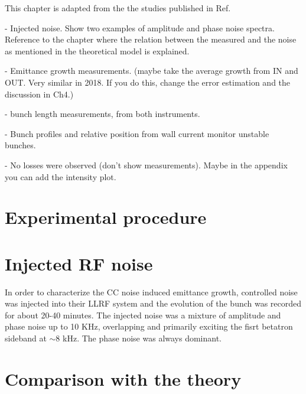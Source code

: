 \vspace*{-1mm}
 This chapter is adapted from the the studies published in Ref.~\cite{Triantafyllou}

- Injected noise. Show two examples of amplitude and phase noise spectra. Reference to the chapter where the relation between the measured and the noise as mentioned in the theoretical model is explained.

- Emittance growth measurements. (maybe take the average growth from IN and OUT. Very similar in 2018. If you do this, change the error estimation and the discussion in Ch4.)

- bunch length measurements, from both instruments. 

- Bunch profiles and relative position from wall current monitor unstable bunches.

- No losses were observed (don't show measurements). Maybe in the appendix you can add the intensity plot.

\section{Experimental procedure}



 \section{Injected RF noise} 

 In order to characterize the CC noise induced emittance growth, controlled noise was injected into their LLRF system and the evolution of the bunch was recorded for about 20-40 minutes. The injected noise was a mixture of amplitude and phase noise up to 10 KHz, overlapping and primarily exciting the fisrt betatron sideband at $\sim 8$ kHz. The phase noise was always dominant.  

 \section{Comparison with the theory}\label{sec:MD2018_vs_theory}